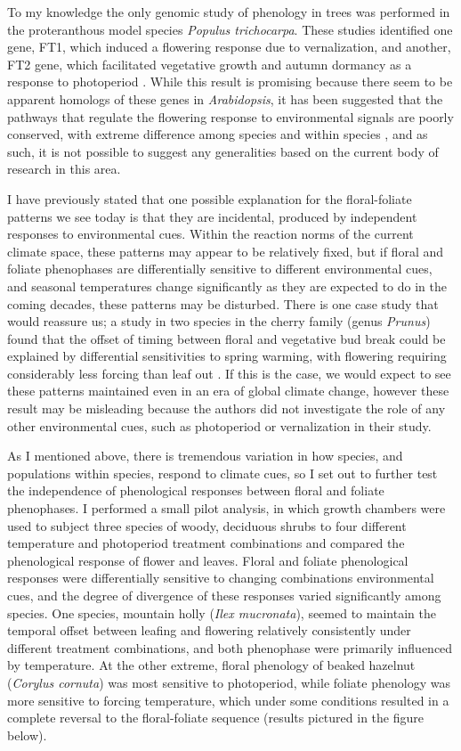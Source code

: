 \documentclass{article}\usepackage[]{graphicx}\usepackage[]{color}
\begin{document}
\par To my knowledge the only genomic study of phenology in trees was performed in the proteranthous model species \textit{Populus trichocarpa}. These studies identified one gene, FT1, which induced a flowering response due to vernalization, and another, FT2 gene, which facilitated vegetative growth and autumn dormancy as a response to photoperiod \citep{Glover2014}. While this result is promising because there seem to be apparent homologs of these genes in \textit{Arabidopsis}, it has been suggested that the pathways that regulate the flowering response to environmental signals are poorly conserved, with extreme difference among species and within species \citep{Blackman2017}, and as such, it is not possible to suggest any generalities based on the current body of research in this area.
\par I have previously stated that one possible explanation for the floral-foliate patterns we see today is that they are incidental, produced by independent responses to environmental cues. Within the reaction norms of the current climate space, these patterns may appear to be relatively fixed, but if floral and foliate phenophases are differentially sensitive to different environmental cues, and seasonal temperatures change significantly as they are expected to do in the coming decades, these patterns may be disturbed. There is one case study that would reassure us; a study in two species in the cherry family (genus \textit{Prunus}) found that the offset of timing between floral and vegetative bud break could be explained by differential sensitivities to spring warming, with flowering requiring considerably less forcing than leaf out \citep{Guo2014}. If this is the case, we would expect to see these patterns maintained even in an era of global climate change, however these result may be misleading because the authors did not investigate the role of any other environmental cues, such as photoperiod or vernalization in their study.
\par As I mentioned above, there is tremendous variation in how species, and populations within species, respond to climate cues, so I set out to further test the independence of phenological responses between floral and foliate phenophases. I performed a small pilot analysis, in which growth chambers were used to subject three species of woody, deciduous shrubs to four different temperature and photoperiod treatment combinations and compared the phenological response of flower and leaves. Floral and foliate phenological responses were differentially sensitive to changing combinations environmental cues, and the degree of divergence of these responses varied significantly among species. One species, mountain holly  (\textit{Ilex mucronata}), seemed to maintain the temporal offset between leafing and flowering relatively consistently under different treatment combinations, and both phenophase were primarily influenced by temperature. At the other extreme, floral phenology of beaked hazelnut (\textit{Corylus cornuta}) was most sensitive to photoperiod, while foliate phenology was more sensitive to forcing temperature, which under some conditions resulted in a complete reversal to the floral-foliate sequence (results pictured in the figure below).
\end{document}
